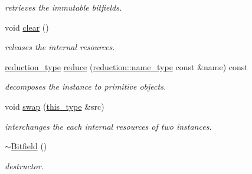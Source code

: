 \begin{DoxyCompactItemize}
\begin{DoxyCompactList}\small\item\em retrieves the immutable bitfields. \end{DoxyCompactList}\item 
\hypertarget{classhryky_1_1_bitfield_a0e0528ec842e58a4e5d865c9cda07a46}{void \hyperlink{classhryky_1_1_bitfield_a0e0528ec842e58a4e5d865c9cda07a46}{clear} ()}\label{classhryky_1_1_bitfield_a0e0528ec842e58a4e5d865c9cda07a46}

\begin{DoxyCompactList}\small\item\em releases the internal resources. \end{DoxyCompactList}\item 
\hypertarget{classhryky_1_1_bitfield_a5cebc48b87ae30dfa43cbcbda5cc9de8}{\hyperlink{namespacehryky_a343a9a4c36a586be5c2693156200eadc}{reduction\-\_\-type} \hyperlink{classhryky_1_1_bitfield_a5cebc48b87ae30dfa43cbcbda5cc9de8}{reduce} (\hyperlink{namespacehryky_1_1reduction_ac686c30a4c8d196bbd0f05629a6b921f}{reduction\-::name\-\_\-type} const \&name) const }\label{classhryky_1_1_bitfield_a5cebc48b87ae30dfa43cbcbda5cc9de8}

\begin{DoxyCompactList}\small\item\em decomposes the instance to primitive objects. \end{DoxyCompactList}\item 
\hypertarget{classhryky_1_1_bitfield_a8425c4e2e86ec47dca85a13fdcee5ee0}{void \hyperlink{classhryky_1_1_bitfield_a8425c4e2e86ec47dca85a13fdcee5ee0}{swap} (\hyperlink{classhryky_1_1_bitfield_a92159139a91a26878ed5293d99024434}{this\-\_\-type} \&src)}\label{classhryky_1_1_bitfield_a8425c4e2e86ec47dca85a13fdcee5ee0}

\begin{DoxyCompactList}\small\item\em interchanges the each internal resources of two instances. \end{DoxyCompactList}\item 
\hypertarget{classhryky_1_1_bitfield_a7b60506d4c34f3c1b341029e2ae3ac29}{\hyperlink{classhryky_1_1_bitfield_a7b60506d4c34f3c1b341029e2ae3ac29}{$\sim$\-Bitfield} ()}\label{classhryky_1_1_bitfield_a7b60506d4c34f3c1b341029e2ae3ac29}

\begin{DoxyCompactList}\small\item\em destructor. \end{DoxyCompactList}\end{DoxyCompactItemize}
